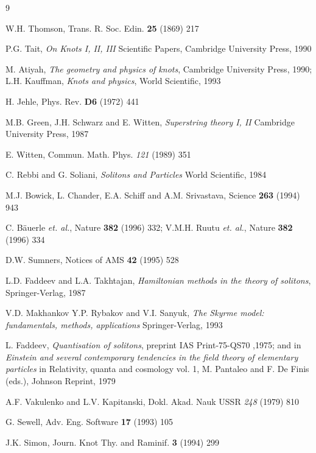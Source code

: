  
\begin{thebibliography}{9}
 
 W.H. Thomson, Trans. R. Soc. Edin. {\bf
25} (1869) 217 


 P.G. Tait, {\it On Knots I, 
II, III } Scientific Papers,
Cambridge University Press, 1990

 
 M. Atiyah, {\it The geometry and physics
of knots}, Cambridge University Press, 1990; 
L.H. Kauffman, {\it Knots and physics}, World Scientific,
1993

 H. Jehle, Phys. Rev. {\bf D6} (1972) 441

 M.B. Green, J.H. Schwarz and E. Witten, {\it
Superstring theory I, II } Cambridge University Press, 1987

 E. Witten, Commun. Math. Phys. {\it 121}
(1989) 351

 C. Rebbi and G. Soliani, {\it Solitons
and Particles} World Scientific, 1984

 M.J. Bowick, L. Chander, E.A. Schiff
and A.M. Srivastava, Science {\bf 263} (1994) 943

 C. B\"auerle {\it et. al.}, 
Nature {\bf 382} (1996) 332; V.M.H. Ruutu
{\it et. al.}, Nature {\bf 382} (1996) 334
 
 D.W. Sumners,  Notices of AMS {\bf 42} (1995) 528

 L.D. Faddeev and L.A. Takhtajan,
{\it Hamiltonian methods in the theory of solitons},
Springer-Verlag, 1987

 V.D. Makhankov Y.P. Rybakov and V.I. Sanyuk, 
{\it The Skyrme model: fundamentals, methods, applications}
Springer-Verlag, 1993

 L. Faddeev, {\it Quantisation of solitons},
preprint IAS Print-75-QS70 ,1975; and in  {\it Einstein
and several contemporary tendencies in the field theory
of elementary particles} in Relativity, quanta and 
cosmology vol. 1, M. Pantaleo and F. De Finis (eds.),
Johnson Reprint, 1979

 A.F. Vakulenko and L.V. Kapitanski, 
Dokl. Akad. Nauk USSR {\it 248} (1979) 810

 G. Sewell, Adv. Eng. Software {\bf 17} (1993) 105

 J.K. Simon, Journ. Knot Thy. and Raminif. {\bf 3} (1994)
299
 
 
\end{thebibliography}

